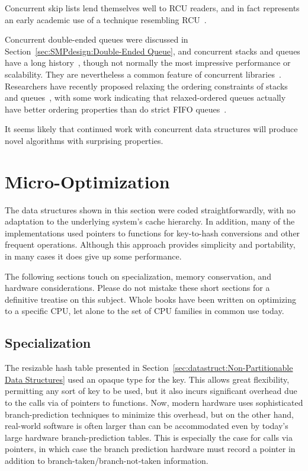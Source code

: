 Concurrent skip lists lend themselves well to RCU readers, and in fact
represents an early academic use of a technique resembling
RCU~\cite{Pugh90}.

Concurrent double-ended queues were discussed in
Section~\ref{sec:SMPdesign:Double-Ended Queue},
and concurrent stacks and queues have a long history~\cite{Treiber86},
though not normally the most impressive performance or scalability.
They are nevertheless a common feature of concurrent
libraries~\cite{PaulMcKenney2013LWNURCUqueuestack}.
Researchers have recently proposed relaxing the ordering constraints
of stacks and queues~\cite{Shavit:2011:DSM:1897852.1897873},
with some work indicating that relaxed-ordered queues actually have
better ordering properties than do strict FIFO
queues~\cite{AndreasHaas2012FIFOisnt,ChristophMKirsch2012FIFOisntTR,AndreasHaas2013CFRelaxedQueues}.

It seems likely that continued work with concurrent data structures will
produce novel algorithms with surprising properties.

\section{Micro-Optimization}
\label{sec:datastruct:Micro-Optimization}

The data structures shown in this section were coded straightforwardly,
with no adaptation to the underlying system's cache hierarchy.
In addition, many of the implementations used pointers to functions
for key-to-hash conversions and other frequent operations.
Although this approach provides simplicity and portability, in many
cases it does give up some performance.

The following sections touch on specialization, memory conservation,
and hardware considerations.
Please do not mistake these short sections for a definitive treatise
on this subject.
Whole books have been written on optimizing to a specific CPU, let
alone to the set of CPU families in common use today.

\subsection{Specialization}
\label{sec:datastruct:Specialization}

The resizable hash table presented in
Section~\ref{sec:datastruct:Non-Partitionable Data Structures}
used an opaque type for the key.
This allows great flexibility, permitting any sort of key to be
used, but it also incurs significant overhead due to the calls via
of pointers to functions.
Now, modern hardware uses sophisticated branch-prediction techniques
to minimize this overhead, but on the other hand, real-world software
is often larger than can be accommodated even by today's large
hardware branch-prediction tables.
This is especially the case for calls via pointers, in which case
the branch prediction hardware must record a pointer in addition
to branch-taken/branch-not-taken information.

